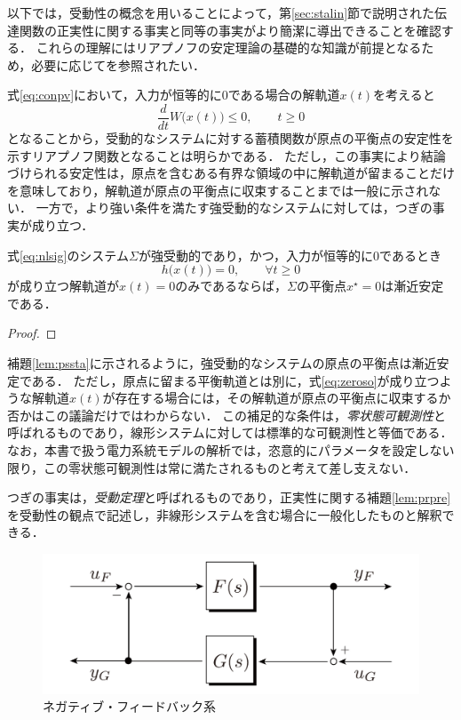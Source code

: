 \documentclass[a4j,10pt,oneside,openany,dvipdfmx]{jsbook}
\begin{document}
以下では，受動性の概念を用いることによって，第\ref{sec:stalin}節で説明された伝達関数の正実性に関する事実と同等の事実がより簡潔に導出できることを確認する．
これらの理解にはリアプノフの安定理論の基礎的な知識が前提となるため，必要に応じてを参照されたい．

式\eqref{eq:conpv}において，入力が恒等的に0である場合の解軌道$x(t)$を考えると
\[
\frac{d}{dt} W\bigl( x(t) \bigr) \leq 0
,\qquad
t \geq 0
\]
となることから，受動的なシステムに対する蓄積関数が原点の平衡点の安定性を示すリアプノフ関数となることは明らかである．
ただし，この事実により結論づけられる安定性は，原点を含むある有界な領域の中に解軌道が留まることだけを意味しており，解軌道が原点の平衡点に収束することまでは一般に示されない．
一方で，より強い条件を満たす強受動的なシステムに対しては，つぎの事実が成り立つ．

\begin{lemma}\label{lem:pssta}
式\eqref{eq:nlsig}のシステム$\Sigma$が強受動的であり，かつ，入力が恒等的に0であるとき
\begin{equation}\label{eq:zeroso}
h\bigl(
x(t)
\bigr)=0,\qquad
\forall t\geq 0
\end{equation}
が成り立つ解軌道が$x(t)=0$のみであるならば，$\Sigma$の平衡点$x^{\star}=0$は漸近安定である．
\end{lemma}

\begin{proof}
\proofend
\end{proof}

補題\ref{lem:pssta}に示されるように，強受動的なシステムの原点の平衡点は漸近安定である．
ただし，原点に留まる平衡軌道とは別に，式\eqref{eq:zeroso}が成り立つような解軌道$x(t)$が存在する場合には，その解軌道が原点の平衡点に収束するか否かはこの議論だけではわからない．
この補足的な条件は，\emph{零状態可観測性}と呼ばれるものであり，線形システムに対しては標準的な可観測性と等価である．
なお，本書で扱う電力系統モデルの解析では，恣意的にパラメータを設定しない限り，この零状態可観測性は常に満たされるものと考えて差し支えない．


つぎの事実は，\emph{受動定理}と呼ばれるものであり，正実性に関する補題\ref{lem:prpre}を受動性の観点で記述し，非線形システムを含む場合に一般化したものと解釈できる．

\begin{figure}[t]
  \centering
  \includegraphics[width = .40\linewidth]{figs/staFGIO}
  \caption{ネガティブ・フィードバック系}
  \label{fig:stasig12}
\end{figure}
\end{document}
